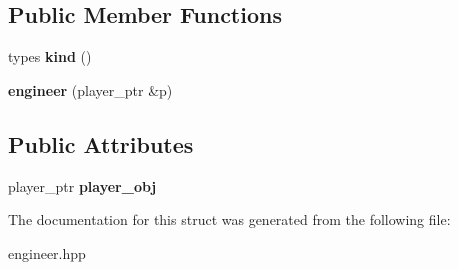 \subsection*{Public Member Functions}
\begin{DoxyCompactItemize}
\item 
\mbox{\label{structmods_1_1classes_1_1engineer_add3c8c3adfcd08b60bb614b365707e9e}} 
types {\bfseries kind} ()
\item 
\mbox{\label{structmods_1_1classes_1_1engineer_ae117bd9026f122f88d9813f67730f037}} 
{\bfseries engineer} (player\+\_\+ptr \&p)
\end{DoxyCompactItemize}
\subsection*{Public Attributes}
\begin{DoxyCompactItemize}
\item 
\mbox{\label{structmods_1_1classes_1_1engineer_ad9917d93905d605da8bff6faa42db3c4}} 
player\+\_\+ptr {\bfseries player\+\_\+obj}
\end{DoxyCompactItemize}


The documentation for this struct was generated from the following file\+:\begin{DoxyCompactItemize}
\item 
engineer.\+hpp\end{DoxyCompactItemize}
